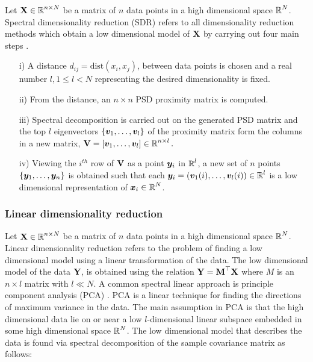 Let $\textbf{X} \in \operatorname{\mathbb{R}}^{n \times N}$ be a matrix of $n$ data points in a high dimensional space $\operatorname{\mathbb{R}}^{N}$. Spectral dimensionality reduction (SDR) refers to all
dimensionality reduction methods which obtain a low dimensional model of $\textbf{X}$
by carrying out four main steps \cite{Lawrence2010}.
\begin{itemize}
\item[i)] A distance $d_{ij} = \text{dist}(x_{i}, x_{j})$, between data points
is chosen and a real number $l, 1 \leq l < N$ representing the desired dimensionality is fixed.
\item[ii)] From the distance, an $n \times n$ PSD proximity matrix  is computed.
\item[iii)] Spectral decomposition is carried out on the generated PSD matrix and
the top $l$ eigenvectors $\{ \boldsymbol{v}_{1}, \ldots, \boldsymbol{v}_{l} \}$ of the proximity matrix
form the columns in a new matrix, $\textbf{V} = [\boldsymbol{v}_{1}, \ldots, \boldsymbol{v}_{l}] \in \operatorname{\mathbb{R}}^{n \times l}.$
\item[iv)] Viewing the $i^{th}$ row of $\textbf{V}$ as a point $\boldsymbol{y}_{i}$
in $\operatorname{\mathbb{R}}^{l}$, a new set of $n$ points 
$\{\boldsymbol{y}_{1}, \ldots, \boldsymbol{y}_{n} \}$ is obtained such that each
 $\boldsymbol{y}_{i} = (\boldsymbol{v}_{1}(i), \ldots, \boldsymbol{v}_{l}(i)) \in \operatorname{\mathbb{R}}^{l}$
is a low dimensional representation of $\boldsymbol{x}_{i} \in \operatorname{\mathbb{R}}^{N}$.
\end{itemize}


\subsubsection{Linear dimensionality reduction}
Let $\textbf{X} \in \operatorname{\mathbb{R}}^{n \times N}$ be a matrix of $n$ data points in a high dimensional space $\operatorname{\mathbb{R}}^{N}$. Linear dimensionality reduction refers to the problem of finding a low dimensional model using a linear transformation of the data. The low dimensional model of the data $\textbf{Y}$, is obtained using the relation $\textbf{Y} = \textbf{M}^{\top}\textbf{X}$ where $M$ is an $n \times l$ matrix with $l \ll N$. A common spectral linear approach is principle component analysis (PCA) \cite{JolliffeIT1986PCAa}. PCA is a linear technique for finding the directions of maximum variance in the data. The main assumption in PCA is that the high dimensional data lie on or near a low $l$-dimensional linear subspace embedded in some high dimensional space $\operatorname{\mathbb{R}}^{N}$. 
The low dimensional model that describes the data is found via spectral decomposition of the sample covariance matrix as follows:

